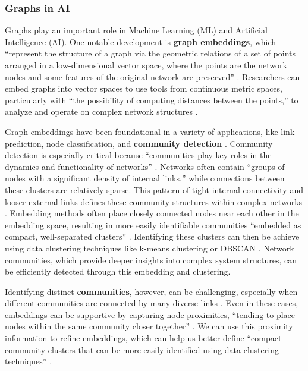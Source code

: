 \subsubsection{Graphs in AI}
Graphs play an important role in Machine Learning (ML) and Artificial Intelligence (AI). One notable development is \textbf{graph embeddings}, which “represent the structure of a graph via the geometric relations of a set of points arranged in a low-dimensional vector space, where the points are the network nodes and some features of the original network are preserved” \citep[p. 1]{kovacs_iterative_2024}. Researchers can embed graphs into vector spaces to use tools from continuous metric spaces, particularly with “the possibility of computing distances between the points,” to analyze and operate on complex network structures \citep[p. 1]{kovacs_iterative_2024}.

Graph embeddings have been foundational in a variety of applications, like link prediction, node classification, and \textbf{community detection} \citep[p. 1]{kovacs_iterative_2024}. Community detection is especially critical because “communities play key roles in the dynamics and functionality of networks” \citep[p. 1]{kovacs_iterative_2024}. Networks often contain  “groups of nodes with a significant density of internal links,” \citep[p. 1]{kovacs_iterative_2024} while connections between these clusters are relatively sparse. This pattern of tight internal connectivity and looser external links defines these community structures within complex networks \citep[p. 1]{kovacs_iterative_2024}. Embedding methods often place closely connected nodes near each other in the embedding space, resulting in more easily identifiable communities “embedded as compact, well-separated clusters” \citep[p. 1]{kovacs_iterative_2024}. Identifying these clusters can then be achieve using data clustering techniques like k-means clustering or DBSCAN \citep[p. 1]{kovacs_iterative_2024}. Network communities, which provide deeper insights into complex system structures, can be efficiently detected through this embedding and clustering.

Identifying distinct \textbf{communities}, however, can be challenging, especially when different communities are connected by many diverse links \citep[p. 1]{kovacs_iterative_2024}. Even in these cases, embeddings can be supportive by capturing node proximities, “tending to place nodes within the same community closer together” \citep[p. 1]{kovacs_iterative_2024}. We can use this proximity information to refine embeddings, which can help us better define “compact community clusters that can be more easily identified using data clustering techniques” \citep[p. 1]{kovacs_iterative_2024}.

